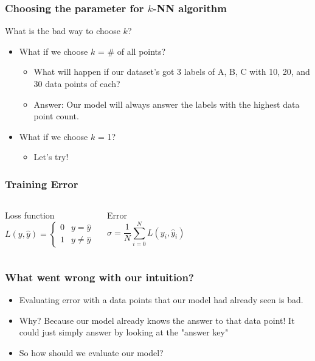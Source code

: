 \documentclass[aspectratio=169]{beamer}
\begin{document}
\begin{frame}
	\frametitle{Choosing the parameter for $k$-NN algorithm}
	 What is the bad way to choose $k$?
	\begin{itemize}
		\item<3-> What if we choose $k$ = \# of all points?
		      \begin{itemize}
			      \item<4-> What will happen if our dataset's got 3 labels of A, B, C with 10, 20, and 30 data points of each?
			      \item<5-> Answer: Our model will always answer the labels with the highest data point count.
		      \end{itemize}
		\item<6-> What if we choose $k$ = 1?
		      \begin{itemize}
			      \item<7-> Let's try!
		      \end{itemize}
	\end{itemize}
\end{frame}

\begin{frame}
	\frametitle{Training Error}
	\begin{figure}
	\end{figure}
	\begin{columns}[t]
		\begin{block}{Loss function}
			$$L(y, \hat{y}) =
				\begin{cases}
					0 & y = \hat{y}    \\
					1 & y \neq \hat{y}
				\end{cases}
			$$
		\end{block}
		\begin{block}{Error}
			$$\sigma = \frac{1}{N}\sum_{i=0}^{N}L(y_i, \hat{y}_i)$$
		\end{block}
	\end{columns}
\end{frame}

\begin{frame}
	\frametitle{What went wrong with our intuition?}
	\begin{itemize}
		\item<2-> Evaluating error with a data points that our model had already seen is bad.
		\item<3-> Why? Because our model already knows the answer to that data point! It could just simply answer by looking at the "answer key"
		\item<4-> So how should we evaluate our model?
	\end{itemize}
\end{frame}
\end{document}

